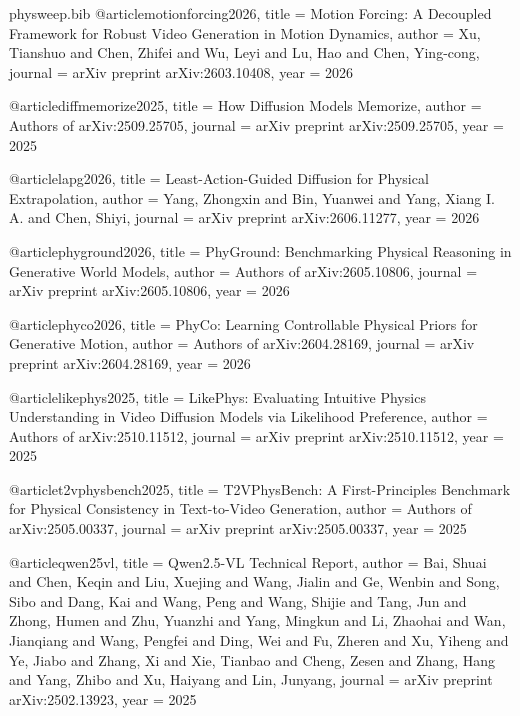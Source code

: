 \begin{filecontents}{physweep.bib}
@article{motionforcing2026,
  title   = {Motion Forcing: A Decoupled Framework for Robust Video Generation in Motion Dynamics},
  author  = {Xu, Tianshuo and Chen, Zhifei and Wu, Leyi and Lu, Hao and Chen, Ying-cong},
  journal = {arXiv preprint arXiv:2603.10408},
  year    = {2026}
}

@article{diffmemorize2025,
  title   = {How Diffusion Models Memorize},
  author  = {{Authors of arXiv:2509.25705}},
  journal = {arXiv preprint arXiv:2509.25705},
  year    = {2025}
}

@article{lapg2026,
  title   = {Least-Action-Guided Diffusion for Physical Extrapolation},
  author  = {Yang, Zhongxin and Bin, Yuanwei and Yang, Xiang I. A. and Chen, Shiyi},
  journal = {arXiv preprint arXiv:2606.11277},
  year    = {2026}
}

@article{phyground2026,
  title   = {{PhyGround}: Benchmarking Physical Reasoning in Generative World Models},
  author  = {{Authors of arXiv:2605.10806}},
  journal = {arXiv preprint arXiv:2605.10806},
  year    = {2026}
}

@article{phyco2026,
  title   = {{PhyCo}: Learning Controllable Physical Priors for Generative Motion},
  author  = {{Authors of arXiv:2604.28169}},
  journal = {arXiv preprint arXiv:2604.28169},
  year    = {2026}
}

@article{likephys2025,
  title   = {{LikePhys}: Evaluating Intuitive Physics Understanding in Video Diffusion Models via Likelihood Preference},
  author  = {{Authors of arXiv:2510.11512}},
  journal = {arXiv preprint arXiv:2510.11512},
  year    = {2025}
}

@article{t2vphysbench2025,
  title   = {{T2VPhysBench}: A First-Principles Benchmark for Physical Consistency in Text-to-Video Generation},
  author  = {{Authors of arXiv:2505.00337}},
  journal = {arXiv preprint arXiv:2505.00337},
  year    = {2025}
}

@article{qwen25vl,
  title   = {{Qwen2.5-VL} Technical Report},
  author  = {Bai, Shuai and Chen, Keqin and Liu, Xuejing and Wang, Jialin and Ge, Wenbin and Song, Sibo and Dang, Kai and Wang, Peng and Wang, Shijie and Tang, Jun and Zhong, Humen and Zhu, Yuanzhi and Yang, Mingkun and Li, Zhaohai and Wan, Jianqiang and Wang, Pengfei and Ding, Wei and Fu, Zheren and Xu, Yiheng and Ye, Jiabo and Zhang, Xi and Xie, Tianbao and Cheng, Zesen and Zhang, Hang and Yang, Zhibo and Xu, Haiyang and Lin, Junyang},
  journal = {arXiv preprint arXiv:2502.13923},
  year    = {2025}
}
\end{filecontents}
\documentclass[10pt]{article}


